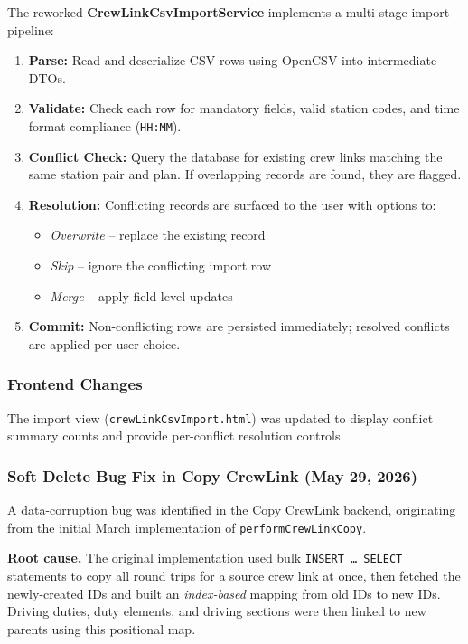 \documentclass[12pt,a4paper]{article}
\begin{document}
The reworked \textbf{CrewLinkCsvImportService} implements a multi-stage import
pipeline:

\begin{enumerate}[leftmargin=1.5em]
    \item \textbf{Parse:} Read and deserialize CSV rows using OpenCSV into
          intermediate DTOs.
    \item \textbf{Validate:} Check each row for mandatory fields, valid station
          codes, and time format compliance (\texttt{HH:MM}).
    \item \textbf{Conflict Check:} Query the database for existing crew links
          matching the same station pair and plan. If overlapping records are
          found, they are flagged.
    \item \textbf{Resolution:} Conflicting records are surfaced to the user
          with options to:
        \begin{itemize}
            \item \textit{Overwrite} -- replace the existing record
            \item \textit{Skip} -- ignore the conflicting import row
            \item \textit{Merge} -- apply field-level updates
        \end{itemize}
    \item \textbf{Commit:} Non-conflicting rows are persisted immediately;
          resolved conflicts are applied per user choice.
\end{enumerate}

\subsubsection{Frontend Changes}

The import view (\texttt{crewLinkCsvImport.html}) was updated to display
conflict summary counts and provide per-conflict resolution controls.

\subsubsection{Soft Delete Bug Fix in Copy CrewLink (May 29, 2026)}

A data-corruption bug was identified in the Copy CrewLink backend, originating
from the initial March implementation of \texttt{performCrewLinkCopy}.

\textbf{Root cause.} The original implementation used bulk \texttt{INSERT \ldots
SELECT} statements to copy all round trips for a source crew link at once, then
fetched the newly-created IDs and built an \textit{index-based} mapping from old
IDs to new IDs. Driving duties, duty elements, and driving sections were then
linked to new parents using this positional map.
\end{document}

